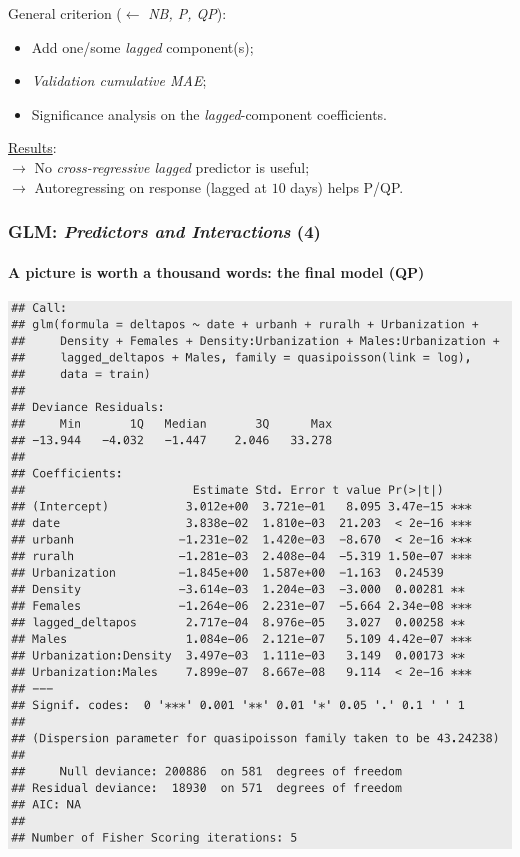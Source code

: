 \documentclass{beamer}
\begin{document}
{\begin{frame}
	\hfill

	General criterion ($\leftarrow$ \textit{NB, P, QP}):
	\begin{itemize}
		\item{Add one/some \textit{lagged} component(s);}
		\item{\textit{Validation cumulative MAE};}
		\item{Significance analysis on the \textit{lagged}-component coefficients.}
	\end{itemize}

	\hfill

	\underline{Results}:\\
	$\rightarrow$ No \textit{cross-regressive lagged} predictor is useful;\\
	$\rightarrow$ Autoregressing on response (lagged at $10$ days) helps P/QP.

\end{frame}

\begin{frame}
	\frametitle{GLM: \textit{Predictors and Interactions} (4)}
	\framesubtitle{A picture is worth a thousand words: the final model (QP)}

	\begin{center}
		\center \includegraphics[scale = 0.3]{summary_qpoisson.png}
	\end{center}



\end{frame}}
\end{document}
